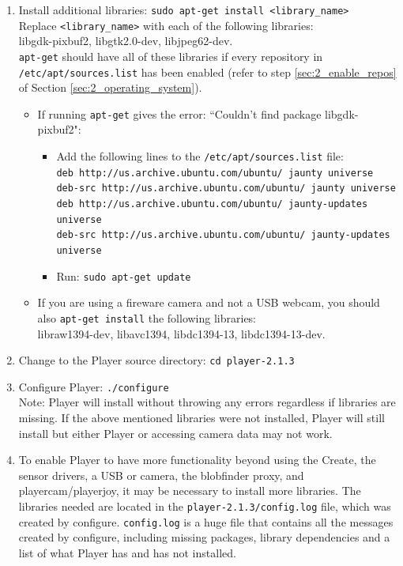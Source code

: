 \begin{enumerate}
\item Install additional libraries: \texttt{sudo apt-get install <library\_name>}\\
Replace \texttt{<library\_name>} with each of the following libraries: \\
libgdk-pixbuf2, libgtk2.0-dev, libjpeg62-dev.\\  
\texttt{apt-get} should have all of these libraries if every repository in \texttt{/etc/apt/sources.list} has been enabled (refer to step \ref{sec:2_enable_repos} of Section \ref{sec:2_operating_system}).
\begin{itemize}
\item If running \texttt{apt-get} gives the error: ``Couldn't find package libgdk-pixbuf2":
\begin{itemize} 
\item Add the following lines to the \texttt{/etc/apt/sources.list} file:\\
\texttt{deb http://us.archive.ubuntu.com/ubuntu/ jaunty universe}\\
\texttt{deb-src http://us.archive.ubuntu.com/ubuntu/ jaunty universe}\\
\texttt{deb http://us.archive.ubuntu.com/ubuntu/ jaunty-updates universe}\\
\texttt{deb-src http://us.archive.ubuntu.com/ubuntu/ jaunty-updates universe}\\
\item Run: \texttt{sudo apt-get update}\\
\end{itemize}

\item If you are using a fireware camera and not a USB webcam, you should also \texttt{apt-get install} the following libraries: \\ libraw1394-dev, libavc1394, libdc1394-13, libdc1394-13-dev.
\end{itemize}

\item Change to the Player source directory: \texttt{cd player-2.1.3}

\item Configure Player: \texttt{./configure}\\
Note: Player will install without throwing any errors regardless if libraries are missing. If the above mentioned libraries were not installed, Player will still install but either Player or accessing camera data may not work.

\item To enable Player to have more functionality beyond using the Create, the sensor drivers, a USB or camera, the blobfinder proxy, and playercam/playerjoy, it may be necessary to install more libraries. The libraries needed are located in the \texttt{player-2.1.3/config.log} file, which was created by configure. \texttt{config.log} is a huge file that contains all the messages created by configure, including missing packages, library dependencies and a list of what Player has and has not installed.


\end{enumerate}
